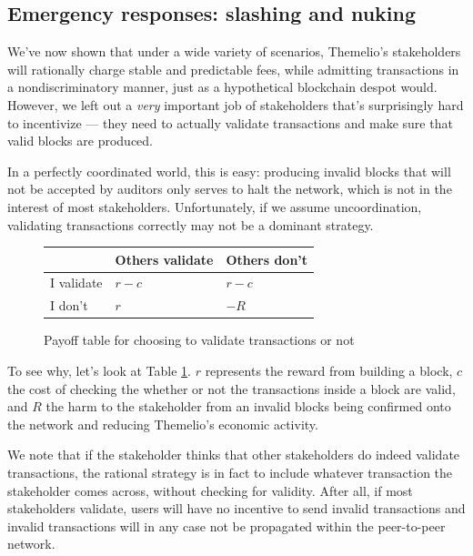 \documentclass[letterpaper,12pt,oneside]{article}
\begin{document}
\subsection{Emergency responses: slashing and nuking}

We've now shown that under a wide variety of scenarios, Themelio's stakeholders will rationally charge stable and predictable fees, while admitting transactions in a nondiscriminatory manner, just as a hypothetical blockchain despot would. However, we left out a \emph{very} important job of stakeholders that's surprisingly hard to incentivize --- they need to actually validate transactions and make sure that valid blocks are produced.

In a perfectly coordinated world, this is easy: producing invalid blocks that will not be accepted by auditors only serves to halt the network, which is not in the interest of most stakeholders. Unfortunately, if we assume uncoordination, validating transactions correctly may not be a dominant strategy.

\begin{figure}
    \centering
    \begin{tabular}{lll}
        \toprule
                   & Others validate & Others don't \\
        \midrule
        I validate & $r-c$           & $r-c$        \\
        I don't    & $r$             & $-R$         \\
        \bottomrule
    \end{tabular}
    \caption{Payoff table for choosing to validate transactions or not}
    \label{tab:validateornot}
\end{figure}

To see why, let's look at Table \ref{tab:validateornot}. $r$ represents the reward from building a block, $c$ the cost of checking the whether or not the transactions inside a block are valid, and $R$ the harm to the stakeholder from an invalid blocks being confirmed onto the network and reducing Themelio's economic activity.

We note that if the stakeholder thinks that other stakeholders do indeed validate transactions, the rational strategy is in fact to include whatever transaction the stakeholder comes across, without checking for validity. After all, if most stakeholders validate, users will have no incentive to send invalid transactions and invalid transactions will in any case not be propagated within the peer-to-peer network.
\end{document}
